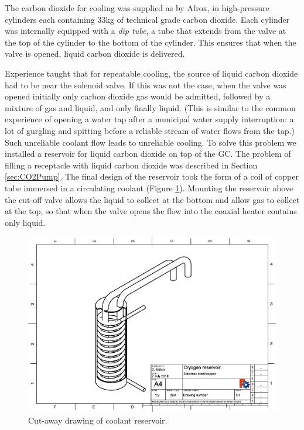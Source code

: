The carbon dioxide for cooling was supplied as by Afrox, in high-pressure
cylinders each containing 33kg of technical grade carbon dioxide. Each cylinder
was internally equipped with a \textit{dip tube}, a tube that extends from the
valve at the top of the cylinder to the bottom of the cylinder. This ensures
that when the valve is opened, liquid carbon dioxide is delivered.

Experience taught that for repeatable cooling, the source of liquid carbon
dioxide had to be near the solenoid valve. If this was not the case, when the
valve was opened initially only carbon dioxide gas would be admitted, followed
by a mixture of gas and liquid, and only finally liquid. (This is similar to the
common experience of opening a water tap after a municipal water supply
interruption: a lot of gurgling and spitting before a reliable stream of water
flows from the tap.) Such unreliable coolant flow leads to unreliable cooling.
To solve this problem we installed a reservoir for liquid carbon dioxide on top
of the GC. The problem of filling a receptacle with liquid carbon dioxide was
described in Section \ref{sec:CO2Pump}. The final design of the reservoir took
the form of a coil of copper tube immersed in a circulating coolant (Figure
\ref{fig:CryogenReservoir}). Mounting the reservoir above the cut-off valve
allows the liquid to collect at the bottom and allow gas to collect at the top,
so that when the valve opens the flow into the coaxial heater contains only
liquid.


\begin{figure}
	\centering
	\includegraphics[angle=90, origin=c, scale=0.75]{./Figures/CryogenReservoir.pdf}
	\decoRule
	\caption[Coolant reservoir]{Cut-away drawing of coolant reservoir.}	
	\label{fig:CryogenReservoir}
\end{figure}


